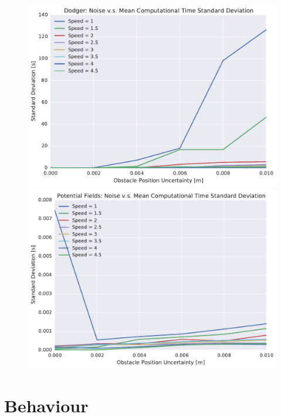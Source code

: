 \begin{figure}[h!]
    \centering
    \includegraphics[width=0.48\linewidth]{figs/planner_std_avg_times_0}
    \includegraphics[width=0.48\linewidth]{figs/pf_std_avg_times_0}
    \caption{}
    \label{fig:plot_std_comp_time}
\end{figure}

\section{Behaviour}


